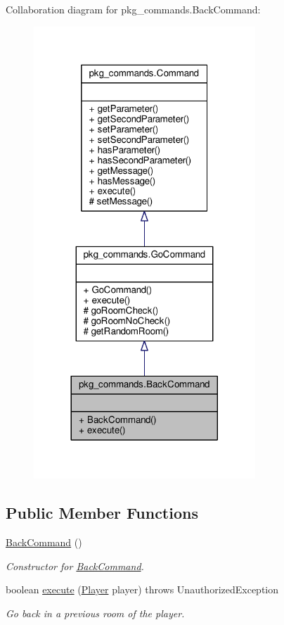 Collaboration diagram for pkg\-\_\-commands.\-Back\-Command\-:
\nopagebreak
\begin{figure}[H]
\begin{center}
\leavevmode
\includegraphics[width=236pt]{classpkg__commands_1_1BackCommand__coll__graph}
\end{center}
\end{figure}
\subsection*{Public Member Functions}
\begin{DoxyCompactItemize}
\item 
\hyperlink{classpkg__commands_1_1BackCommand_a81518eb89a9e9126e51f2f7ba6ff1ed9}{Back\-Command} ()
\begin{DoxyCompactList}\small\item\em Constructor for \hyperlink{classpkg__commands_1_1BackCommand}{Back\-Command}. \end{DoxyCompactList}\item 
boolean \hyperlink{classpkg__commands_1_1BackCommand_a35bf0276436a619d7baeb9c3a752f9d6}{execute} (\hyperlink{classpkg__world_1_1Player}{Player} player)  throws Unauthorized\-Exception 
\begin{DoxyCompactList}\small\item\em Go back in a previous room of the player. \end{DoxyCompactList}\end{DoxyCompactItemize}
